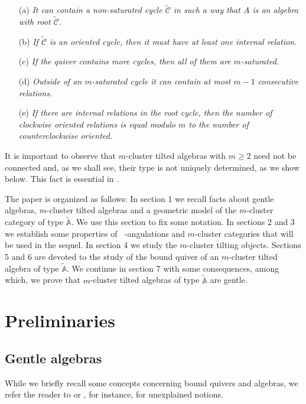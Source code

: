 \documentclass{amsart}
\theoremstyle{plain}
\theoremstyle{definition}
\begin{document}
\begin{itemize}
  \item  [(a)]\textit{It can contain a non-saturated  cycle  $\widetilde{\mathcal{C}}$ in such a way that $A$ is an algebra with root $\widetilde{\mathcal{C}}$.}
  \item [(b)]\textit{If  $\widetilde{\mathcal{C}}$ is an oriented  cycle, then it must have at least one internal relation.}
  \item [(c)]\textit{If the quiver contains  more cycles, then all of them are  $m$-saturated.}
  \item [(d)]\textit{Outside of an $m$-saturated cycle it can contain  at most  $m-1$ consecutive relations.}
  \item [(e)]\textit{If there are internal relations in the root cycle, then  the number of clockwise oriented relations is equal modulo $m$  to the number of counterclockwise oriented.}
\end{itemize}

\medskip

It is important to observe that $m$-cluster tilted algebras  with $m\geq 2$ need not be connected and, as we shall see, their type is not uniquely determined, as we show below. This fact is essential in \cite{FT}.

\medskip
The paper is organized as follows: In section 1 we recall facts about gentle algebras, $m$-cluster tilted algebras and a geometric model of the $m$-cluster category of type $\widetilde{\mathbb{A}}$. We use this section to fix some notation. In sections 2 and 3 we establish some properties of ${\mathop{(m+2)}\nolimits}$-angulations  and  $m$-cluster categories that will be used in the sequel. In section 4   we study the $m$-cluster tilting objects. Sections 5 and 6 are devoted  to the  study of the bound quiver of an $m$-cluster tilted algebra of type  $\widetilde{\mathbb{A}}$.  We continue in section 7 with some consequences, among which, we prove that $m$-cluster tilted algebras of type $\widetilde{\mathbb{A}}$ are gentle.

 

\section{Preliminaries}
\subsection{Gentle algebras}

While we briefly recall some  concepts concerning bound quivers and algebras, we refer the reader to \cite{ASS06} or \cite{ARS95}, for instance, for unexplained notions.
\end{document}
